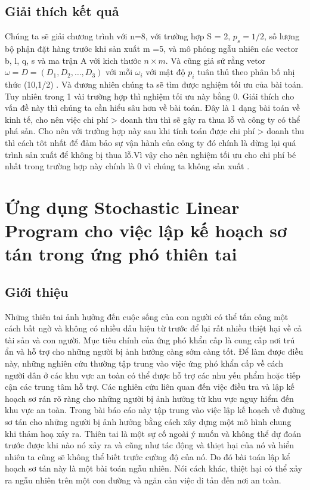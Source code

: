 \documentclass[a4paper]{article}
\begin{document}
        \subsection{Giải thích kết quả} %
    Chúng ta sẽ giải chương trình với n=8, với trường hợp  S = 2, $p_s = 1/2$, số lượng bộ phận đặt hàng trước khi sản xuất m =5, và mô phỏng ngẫu nhiên các vector b, l, q, s và ma trận A với kich thước $n\times m$. Và cũng giả sử rằng vetor $\omega = D =(D_1,D_2,\dots , D_3)$ với mỗi $\omega_i$ với mật độ $p_i$ tuân thủ theo phân bố nhị thức (10,1/2) . Và đương nhiên chúng ta sẽ tìm được nghiệm tối ưu của bài toán. Tuy nhiên trong 1 vài trường hợp thì nghiệm tối ưu này bằng 0. Giải thích cho vấn đề này thì chúng ta cần hiểu sâu hơn về bài toán. Đây là 1 dạng bài toán về kinh tế, cho nên việc chi phí > doanh thu thì sẽ gây ra thua lỗ và công ty có thể phá sản. Cho nên với trường hợp này sau khi tính toán được chi phí > doanh thu thì cách tôt nhất để đảm bảo sự vận hành của công ty đó chính là dừng lại quá trình sản xuất để không bị thua lỗ.Vì vậy cho nên nghiệm tối ưu cho chi phí bé nhất trong trường hợp này chính là 0 vì chúng ta không sản xuất . 

\section{Ứng dụng Stochastic Linear Program cho việc lập kế hoạch sơ tán trong ứng phó thiên tai}
\subsection{Giới thiệu}
Những thiên tai ảnh hưởng đến cuộc sống của con người có thể tấn công một cách bất ngờ và không có nhiều dấu hiệu từ trước để lại rất nhiều thiệt hại về cả tài sản và con người. Mục tiêu chính của ứng phó khẩn cấp là cung cấp nơi trú ẩn và hỗ trợ cho những người bị ảnh hưởng càng sớm càng tốt. Để làm được điều này, những nghiên cứu thường tập trung vào việc ứng phó khẩn cấp về cách người dân ở các khu vực an toàn có thể được hỗ trợ các nhu yếu phẩm hoặc tiếp cận các trung tâm hỗ trợ. Các nghiên cứu liên quan đến việc điều tra và lập kế hoạch sơ rán rõ ràng cho những người bị ảnh hưởng từ khu vực nguy hiểm đến khu vực an toàn. Trong bài báo cáo này tập trung vào việc lập kế hoạch về đường sơ tán cho những người bị ảnh hưởng bằng cách xây dựng một mô hình chung khi thảm hoạ xảy ra. Thiên tai là một sự cố ngoài ý muốn và không thể dự đoán trước được khi nào nó xảy ra và cũng như tác động và thiẹt hại của nó và hiển nhiên ta cũng sẽ không thể biết trước cường độ của nó. Do đó bài toán lập kể hoạch sơ tán này là một bài toán ngẫu nhiên. Nói cách khác, thiệt hại có thể xảy ra ngẫu nhiên trên một con đường và ngăn cản việc di tản đến nơi an toàn.
\end{document}
